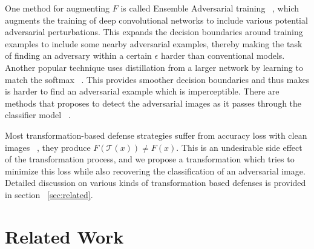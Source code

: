 One method for augmenting $F$ is called Ensemble Adversarial training ~\cite{Tramr2017EnsembleAT},  which augments the training of  deep convolutional networks to include various potential adversarial perturbations. 
This expands the decision boundaries around training examples to include some nearby adversarial examples, thereby making the task of finding an adversary within a certain $\epsilon$ harder than conventional models.
Another popular technique uses distillation from a larger network by learning to match the 
softmax ~\cite{Papernot2016DistillationAA}.
This provides smoother decision boundaries and thus makes is harder to find an adversarial example which is imperceptible.
There are methods that proposes to detect the adversarial images as it passes through the classifier model ~\cite{Meng2017MagNetAT,akhtar2017defense}.

Most transformation-based defense strategies suffer from accuracy loss with clean images  ~\cite{Dziugaite2016ASO,Kurakin2016AdversarialEI}, \ie they produce $F(\mathcal{T}(x)) \neq F(x)$.
This is an undesirable side effect of the transformation process, and we propose a transformation which tries to minimize this loss while also recovering the classification of an adversarial image. 
Detailed discussion on various kinds of transformation based defenses is provided in section ~\ref{sec:related}.

\section{Related Work \label{sec:related}}


